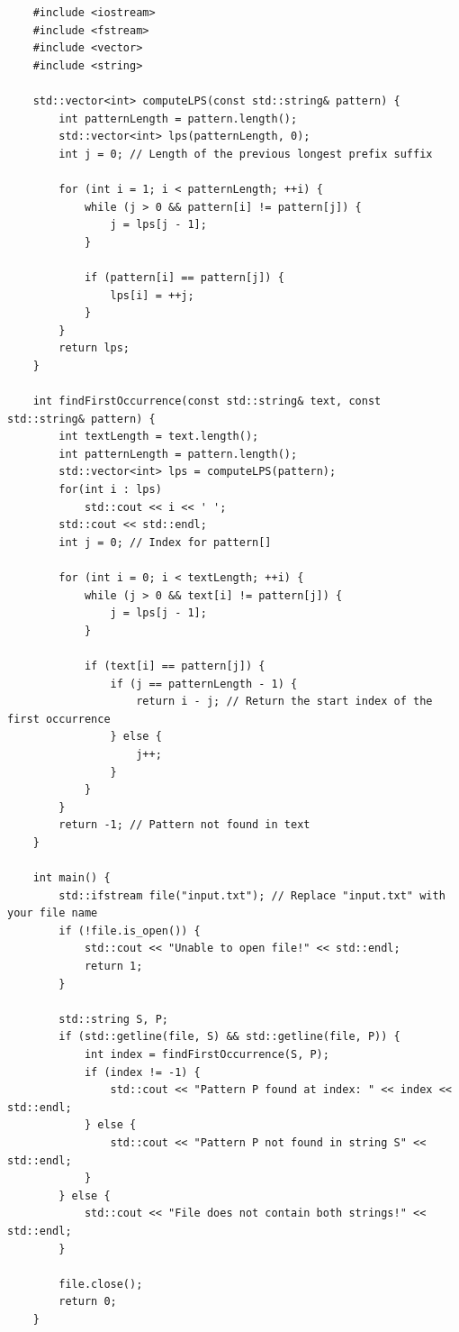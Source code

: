 \documentclass[12pt]{extarticle}
\begin{document}
{\selectfont
\begin{verbatim}
    #include <iostream>
    #include <fstream>
    #include <vector>
    #include <string>
    
    std::vector<int> computeLPS(const std::string& pattern) {
        int patternLength = pattern.length();
        std::vector<int> lps(patternLength, 0);
        int j = 0; // Length of the previous longest prefix suffix
    
        for (int i = 1; i < patternLength; ++i) {
            while (j > 0 && pattern[i] != pattern[j]) {
                j = lps[j - 1];
            }
    
            if (pattern[i] == pattern[j]) {
                lps[i] = ++j;
            }
        }
        return lps;
    }
    
    int findFirstOccurrence(const std::string& text, const std::string& pattern) {
        int textLength = text.length();
        int patternLength = pattern.length();
        std::vector<int> lps = computeLPS(pattern);
        for(int i : lps)
            std::cout << i << ' ';
        std::cout << std::endl;
        int j = 0; // Index for pattern[]
    
        for (int i = 0; i < textLength; ++i) {
            while (j > 0 && text[i] != pattern[j]) {
                j = lps[j - 1];
            }
    
            if (text[i] == pattern[j]) {
                if (j == patternLength - 1) {
                    return i - j; // Return the start index of the first occurrence
                } else {
                    j++;
                }
            }
        }
        return -1; // Pattern not found in text
    }
    
    int main() {
        std::ifstream file("input.txt"); // Replace "input.txt" with your file name
        if (!file.is_open()) {
            std::cout << "Unable to open file!" << std::endl;
            return 1;
        }
    
        std::string S, P;
        if (std::getline(file, S) && std::getline(file, P)) {
            int index = findFirstOccurrence(S, P);
            if (index != -1) {
                std::cout << "Pattern P found at index: " << index << std::endl;
            } else {
                std::cout << "Pattern P not found in string S" << std::endl;
            }
        } else {
            std::cout << "File does not contain both strings!" << std::endl;
        }
    
        file.close();
        return 0;
    }
    
\end{verbatim}
}
\end{document}
